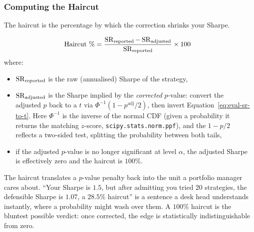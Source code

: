 \subsubsection{Computing the Haircut}

The haircut is the percentage by which the correction shrinks your Sharpe.

\begin{equation}
\label{eq:eval-haircut-pct}
\text{Haircut \%} = \frac{\operatorname{SR}_{\text{reported}} - \operatorname{SR}_{\text{adjusted}}}{\operatorname{SR}_{\text{reported}}} \times 100
\end{equation}
where:
\begin{itemize}[nosep]
  \item $\operatorname{SR}_{\text{reported}}$ is the raw (annualised) Sharpe of the strategy,
  \item $\operatorname{SR}_{\text{adjusted}}$ is the Sharpe implied by the \emph{corrected} $p$-value: convert the adjusted $p$ back to a $t$ via $\Phi^{-1}(1 - p^{\text{adj}}/2)$, then invert Equation~\eqref{eq:eval-sr-to-t}. Here $\Phi^{-1}$ is the inverse of the normal CDF (given a probability it returns the matching $z$-score, \texttt{scipy.stats.norm.ppf}), and the $1 - p/2$ reflects a two-sided test, splitting the probability between both tails,
  \item if the adjusted $p$-value is no longer significant at level $\alpha$, the adjusted Sharpe is effectively zero and the haircut is $100\%$.
\end{itemize}

\begin{intuition}
The haircut translates a $p$-value penalty back into the unit a portfolio manager cares about.
``Your Sharpe is $1.5$, but after admitting you tried 20 strategies, the defensible Sharpe is $1.07$, a $28.5\%$ haircut'' is a sentence a desk head understands instantly, where a probability might wash over them.
A $100\%$ haircut is the bluntest possible verdict: once corrected, the edge is statistically indistinguishable from zero.
\end{intuition}

